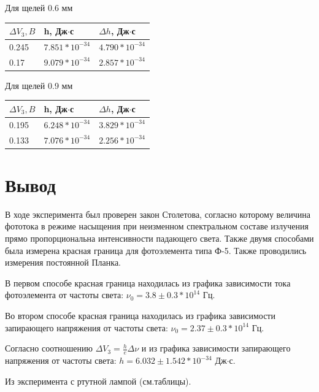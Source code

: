 Для щелей 0.6 мм

\begin{tabular}{ | l | l | l |}
\hline
$\Delta V_3, B$ & h, Дж$\cdot$с & $\Delta h$, Дж$\cdot$с \\ \hline
0.245 & $7.851*10^{-34}$ & $4.790*10^{-34}$ \\
0.17 & $9.079*10^{-34}$ & $2.857*10^{-34}$ \\
\hline
\end{tabular}
 
Для щелей 0.9 мм

\begin{tabular}{ | l | l | l |}
\hline
$\Delta V_3, B$ & h, Дж$\cdot$с & $\Delta h$, Дж$\cdot$с \\ \hline
0.195 & $6.248*10^{-34}$ & $3.829*10^{-34}$ \\
0.133 & $7.076*10^{-34}$ & $2.256*10^{-34}$ \\
\hline
\end{tabular}

\section{Вывод}
В ходе эксперимента был проверен закон Столетова, согласно которому величина фототока в режиме насыщения при неизменном спектральном составе излучения прямо пропорциональна интенсивности падающего света. Также двумя способами была измерена красная граница для фотоэлемента типа Ф-5. Также проводились измерения постоянной Планка.

В первом способе красная граница находилась из графика зависимости тока фотоэлемента от частоты света: $\nu_0=3.8\pm 0.3*10^{14} \text{ Гц}$. 

Во втором способе красная граница находилась из графика зависимости запирающего напряжения от частоты света:  $\nu_0=2.37\pm 0.3*10^{14} \text{ Гц}$.

Согласно соотношению $\Delta V_{3}=\frac he \Delta \nu$ и из графика зависимости запирающего напряжения от частоты света: $h=6.032\pm 1.542*10^{-34}$ Дж$\cdot$с.

Из эксперимента с ртутной лампой (см.таблицы).




